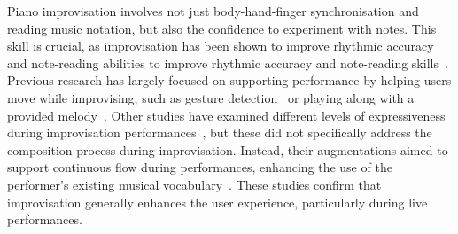 \documentclass{vgtc}                          %
\begin{document}
\par %
Piano improvisation involves not just body-hand-finger synchronisation and reading music notation, but also the confidence to experiment with notes. This skill is crucial, as improvisation has been shown to improve rhythmic accuracy and note-reading abilities to improve rhythmic accuracy and note-reading skills~\cite{montano1984effect}. 
Previous research has largely focused on supporting performance by helping users move while improvising, such as gesture detection~\cite{granieri2019reach} or playing along with a provided melody~\cite{karolus2020hit, ogata2017keyboard}. Other studies have examined different levels of expressiveness during improvisation performances~\cite{das2017music, nicolls2010seeking, santiniaugmented, xiao2013mirrorfugue}, but these did not specifically address the composition process during improvisation. Instead, their augmentations aimed to support continuous flow during performances, enhancing the use of the performer’s existing musical vocabulary~\cite{mcpherson2010augmenting, mcpherson2010toward, sandnes2019enhanced, schmalstieg2007experiences}. These studies confirm that improvisation generally enhances the user experience, particularly during live performances.
\end{document}
